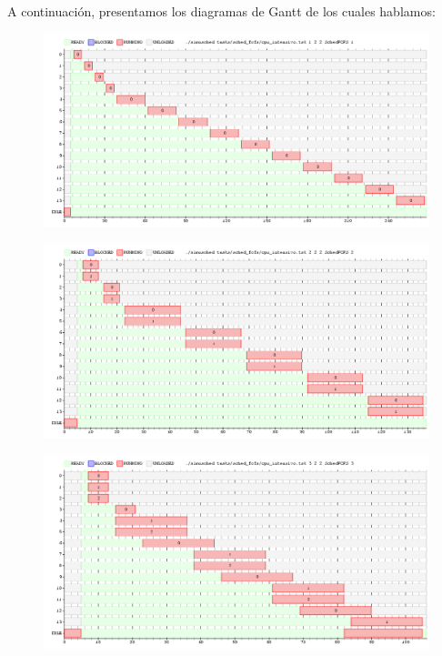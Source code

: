 \documentclass[11pt, a4paper, twoside]{article}
\begin{document}
A continuación, presentamos los diagramas de Gantt de los cuales hablamos: 

\begin{figure}[H]
  \includegraphics [width=\textwidth]{../graficos/sched_fcfs/cpu_intensivo.png}
  \caption{}
\end{figure}
\begin{figure}[H]
  \includegraphics [width=\textwidth]{../graficos/sched_fcfs/cpu_intensivo2.png}
  \caption{}
\end{figure}
\begin{figure}[H]
  \includegraphics [width=\textwidth]{../graficos/sched_fcfs/cpu_intensivo3.png}
  \caption{}
\end{figure}
\end{document}
